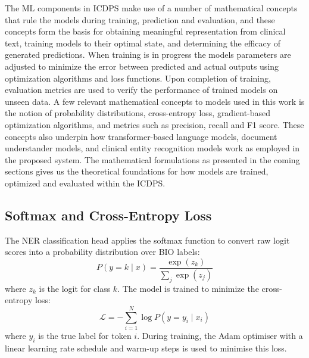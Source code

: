 The ML components in ICDPS make use of a number of mathematical concepts that rule the models during training, prediction and evaluation, and these concepts form the basis for obtaining meaningful representation from clinical text, training models to their optimal state, and determining the efficacy of generated predictions. When training is in progress the models parameters are adjusted to minimize the error between predicted and actual outputs using optimization algorithms and loss functions. Upon completion of training, evaluation metrics are used to verify the performance of trained models on unseen data. A few relevant mathematical concepts to models used in this work is the notion of probability distributions, cross-entropy loss, gradient-based optimization algorithms, and metrics such as precision, recall and F1 score. These concepts also underpin how transformer-based language models, document understander models, and clinical entity recognition models work as employed in the proposed system. The mathematical formulations as presented in the coming sections gives us the theoretical foundations for how models are trained, optimized and evaluated within the ICDPS.

\subsection{Softmax and Cross-Entropy Loss}
The NER classification head applies the softmax function to convert raw logit scores into a probability distribution over BIO labels:
\begin{equation}
P(y = k \mid x) = \frac{\exp(z_k)}{\sum_{j} \exp(z_j)}
\label{eq:softmax}
\end{equation}
where $z_k$ is the logit for class $k$. The model is trained to minimize the cross-entropy loss:
\begin{equation}
\mathcal{L} = -\sum_{i=1}^{N} \log P(y = y_i \mid x_i)
\label{eq:cross_entropy}
\end{equation}
where $y_i$ is the true label for token $i$. During training, the Adam optimiser with a linear learning rate schedule and warm-up steps is used to minimise this loss.

